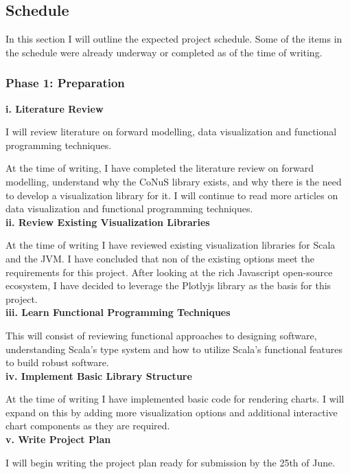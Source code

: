 \documentclass[12pt]{article}
\begin{document}
\subsection{Schedule}
In this section I will outline the expected project schedule. Some of the items in the schedule were already underway or completed as of the time of writing.

\subsubsection{Phase 1: Preparation}

\textbf{i. Literature Review}

I will review literature on forward modelling, data visualization and functional programming techniques. 

At the time of writing, I have completed the literature review on forward modelling, understand why the CoNuS library exists, and why there is the need to develop a visualization library for it. I will continue to read more articles on data visualization and functional programming techniques. \\

\textbf{ii. Review Existing Visualization Libraries}

At the time of writing I have reviewed existing visualization libraries for Scala and the JVM. I have concluded that non of the existing options meet the requirements for this project. After looking at the rich Javascript open-source ecosystem, I have decided to leverage the Plotlyjs library as the basis for this project. \\

\textbf{iii. Learn Functional Programming Techniques}

This will consist of reviewing functional approaches to designing software, understanding Scala's type system and how to utilize Scala's functional features to build robust software. \\

\textbf{iv. Implement Basic Library Structure}

At the time of writing I have implemented basic code for rendering charts. I will expand on this by adding more visualization options and additional interactive chart components as they are required. \\

\textbf{v. Write Project Plan}

I will begin writing the project plan ready for submission by the 25th of June.
\end{document}

